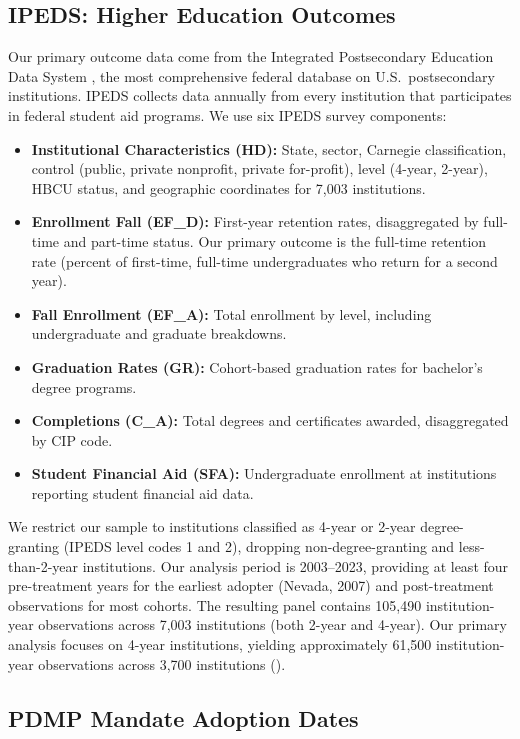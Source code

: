 \documentclass[12pt]{article}
\begin{document}
\subsection{IPEDS: Higher Education Outcomes}

Our primary outcome data come from the Integrated Postsecondary Education Data System \citep{ipeds2024}, the most comprehensive federal database on U.S.\ postsecondary institutions. IPEDS collects data annually from every institution that participates in federal student aid programs. We use six IPEDS survey components:

\begin{itemize}
\item \textbf{Institutional Characteristics (HD):} State, sector, Carnegie classification, control (public, private nonprofit, private for-profit), level (4-year, 2-year), HBCU status, and geographic coordinates for 7,003 institutions.
\item \textbf{Enrollment Fall (EF\_D):} First-year retention rates, disaggregated by full-time and part-time status. Our primary outcome is the full-time retention rate (percent of first-time, full-time undergraduates who return for a second year).
\item \textbf{Fall Enrollment (EF\_A):} Total enrollment by level, including undergraduate and graduate breakdowns.
\item \textbf{Graduation Rates (GR):} Cohort-based graduation rates for bachelor's degree programs.
\item \textbf{Completions (C\_A):} Total degrees and certificates awarded, disaggregated by CIP code.
\item \textbf{Student Financial Aid (SFA):} Undergraduate enrollment at institutions reporting student financial aid data.
\end{itemize}

We restrict our sample to institutions classified as 4-year or 2-year degree-granting (IPEDS level codes 1 and 2), dropping non-degree-granting and less-than-2-year institutions. Our analysis period is 2003--2023, providing at least four pre-treatment years for the earliest adopter (Nevada, 2007) and post-treatment observations for most cohorts. The resulting panel contains 105,490 institution-year observations across 7,003 institutions (both 2-year and 4-year). Our primary analysis focuses on 4-year institutions, yielding approximately 61,500 institution-year observations across 3,700 institutions ().

\subsection{PDMP Mandate Adoption Dates}
\end{document}
